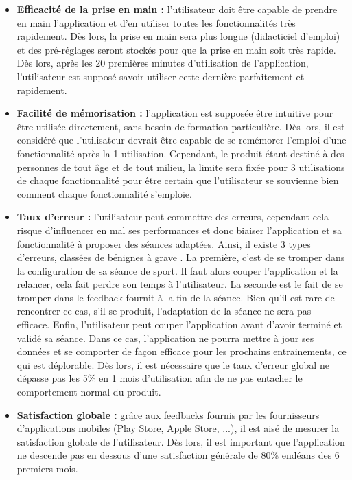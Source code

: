 \begin{itemize}
	\item \textbf{Efficacité de la prise en main :} l'utilisateur doit être capable de prendre en main l'application et d'en utiliser toutes les fonctionnalités très rapidement. Dès lors, la prise en main sera plus longue (didacticiel d'emploi) et des pré-réglages seront stockés pour que la prise en main soit très rapide. Dès lors, après les 20 premières minutes d'utilisation de l'application, l'utilisateur est supposé savoir utiliser cette dernière parfaitement et rapidement.\\
	
	\item \textbf{Facilité de mémorisation :} l'application est supposée être intuitive pour être utilisée directement, sans besoin de formation particulière. Dès lors, il est considéré que l'utilisateur devrait être capable de se remémorer l'emploi d'une fonctionnalité après la 1\iere{} utilisation. Cependant, le produit étant destiné à des personnes de tout âge et de tout milieu, la limite sera fixée pour 3 utilisations de chaque fonctionnalité pour être certain que l'utilisateur se souvienne bien comment chaque fonctionnalité s'emploie.\\
	
	\item \textbf{Taux d'erreur :} l'utilisateur peut commettre des erreurs, cependant cela risque d'influencer en mal ses performances et donc biaiser l'application et sa fonctionnalité à proposer des séances adaptées. Ainsi, il existe 3 types d'erreurs, classées de bénignes à \og grave \fg{}. La première, c'est de se tromper dans la configuration de sa séance de sport. Il faut alors couper l'application et la relancer, cela fait perdre son temps à l'utilisateur. La seconde est le fait de se tromper dans le feedback fournit à la fin de la séance. Bien qu'il est rare de rencontrer ce cas, s'il se produit, l'adaptation de la séance ne sera pas efficace. Enfin, l'utilisateur peut couper l'application avant d'avoir terminé et validé sa séance. Dans ce cas, l'application ne pourra mettre à jour ses données et se comporter de façon efficace pour les prochains entrainements, ce qui est déplorable. Dès lors, il est nécessaire que le taux d'erreur global ne dépasse pas les 5\% en 1 mois d'utilisation afin de ne pas entacher le comportement normal du produit.\\
	
	\item \textbf{Satisfaction globale :} grâce aux feedbacks fournis par les fournisseurs d'applications mobiles (Play Store, Apple Store, ...), il est aisé de mesurer la satisfaction globale de l'utilisateur. Dès lors, il est important que l'application ne descende pas en dessous d'une satisfaction générale de 80\% endéans des 6 premiers mois.
\end{itemize}

